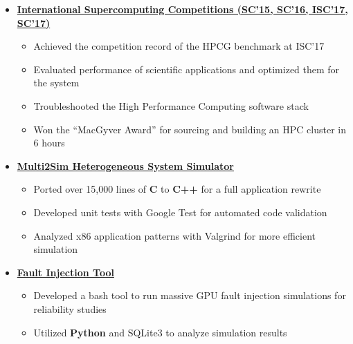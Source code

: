 \documentclass[11pt,letterpaper,sans]{moderncv}
\begin{document}
\begin{itemize}
{\begin{itemize}
	\item \textbf{\href{studentclustercompetition.us}{International Supercomputing Competitions (SC'15, SC'16, ISC'17, SC'17)}}
		\begin{itemize}
		\item Achieved the competition record of the HPCG benchmark at ISC'17
		\item Evaluated performance of scientific applications and optimized them for the system
		\item Troubleshooted the High Performance Computing software stack
		\item Won the ``MacGyver Award'' for sourcing and building an HPC cluster in 6 hours
		\end{itemize}
	\vspace{3pt}	
	\item \textbf{\href{http://multi2sim.org}{Multi2Sim Heterogeneous System Simulator}}
		\begin{itemize}
		\item Ported over 15,000 lines of \textbf{C} to \textbf{C++} for a full application rewrite
		\item Developed unit tests with Google Test for automated code validation
		\item Analyzed x86 application patterns with Valgrind for more efficient simulation
		\end{itemize}
	\vspace{3pt}	

	\item \textbf{\href{https://github.com/spencerhance/multi2sim-FaultInjectionTool}{Fault Injection Tool}}
		\begin{itemize}
		\item Developed a bash tool to run massive GPU fault injection simulations for reliability studies
		\item Utilized \textbf{Python} and SQLite3 to analyze simulation results
		\end{itemize}
		
\end{itemize}		
}
\vspace{6pt}

\end{itemize}




\end{document}
